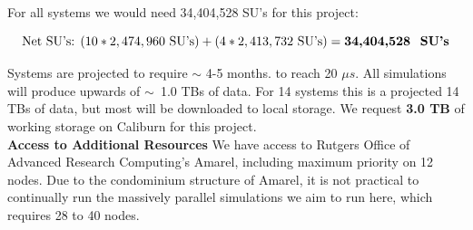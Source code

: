 \documentclass[oneside]{report}
\begin{document}
For all systems we would need 34,404,528 SU's for this project: 

\[\textrm{Net SU's:  } (10*2,474,960 \textrm{ SU's}) + (4*2,413,732 \textrm{ SU's}) = \textbf{34,404,528 \textrm{ SU's}} \]

Systems are projected to require $\sim$ 4-5 months. to reach 20 $\mu s$. All simulations will produce upwards of $\sim$~1.0 TBs of data. For 14 systems this is a projected {14 TBs of data}, but most will be downloaded to local storage.  We request \textbf{3.0 TB} of working storage on Caliburn for this project.  \\

{\bf Access to Additional Resources}
We have access to Rutgers Office of Advanced Research Computing's Amarel, including maximum priority on 12 nodes. Due to the condominium structure of Amarel, it is not practical to continually run the massively parallel simulations we aim to run here, which requires 28 to 40 nodes. 
\clearpage
\end{document}
